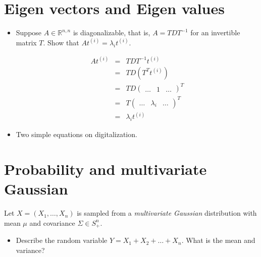 \documentclass[12pt]{article} \usepackage[utf8]{inputenc}
\begin{document}
\section{Eigen vectors and Eigen values}%

\begin{itemize}
  \item Suppose $A\in\mathbb{R}^{n,n}$ is diagonalizable, that is, $A=TDT^{-1}$
    for an invertible matrix $T$. Show that $At^{(i)}= \lambda_i t^{(i)}$.

    \begin{solution}
    \begin{eqnarray}
      At^{(i)}  &=& TDT^{-1} t^{(i)}\\
                &=& TD (T^T t^{(i)})\\ 
                &=& TD \begin{pmatrix} \ldots & 1 & \ldots \end{pmatrix}^T\\
                &= & T \begin{pmatrix} \ldots & \lambda_i & \ldots
                \end{pmatrix}^T\\
                & = & \lambda_i t^{(i)}
    \end{eqnarray}  
    \end{solution}
  \item Two simple equations on digitalization.
\end{itemize}

\section{Probability and multivariate Gaussian}%
\label{sec:probability_and_multivariate_gaussian}

Let $X=(X_1,\ldots, X_n)$  is sampled from a \emph{multivariate Gaussian}
distribution with mean $\mu$ and covariance $\Sigma\in S^n_+$.

\begin{itemize}
  \item Describe the random variable $Y=X_1 + X_2 + \ldots + X_n$. What is the
    mean and variance?
\end{itemize}



\end{document}
